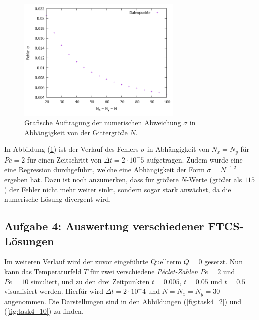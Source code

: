 \documentclass[12pt,a4paper,titlepage,headinclude,bibtotoc]{scrartcl}
\begin{document}
\begin{figure}[H]
 \centering
   \includegraphics[width=0.7\textwidth]{res/task3.png}
   \caption{Grafische Auftragung der numerischen Abweichung $\sigma$ in Abhängigkeit von der Gittergröße $N$.}
 \label{fig:task3}
\end{figure}

In Abbildung (\ref{fig:task3}) ist der Verlauf des Fehlers $\sigma$ in Abhängigkeit von $N_x = N_y$ für $Pe = 2$ für einen Zeitschritt von $\Delta t = 2 \cdot 10^-5$ aufgetragen.
Zudem wurde eine eine Regression durchgeführt, welche eine Abhängigkeit der Form $\sigma = N^{-1.2}$ ergeben hat. Dazu ist noch anzumerken, dass für größere $N$-Werte (größer als $115$) der Fehler nicht mehr weiter sinkt, sondern sogar stark anwächst, da die numerische Lösung divergent wird.


\subsection{Aufgabe 4: Auswertung verschiedener FTCS-Lösungen}
\label{sec:task4}
Im weiteren Verlauf wird der zuvor eingeführte Quellterm $Q=0$ gesetzt. Nun kann das Temperaturfeld $T$ für zwei verschiedene \textit{Péclet-Zahlen} $Pe = 2$ und $Pe = 10$ simuliert, und zu den drei Zeitpunkten $t = 0.005$, $t = 0.05$ und $t=0.5$ visualisiert werden. Hierfür wird $\Delta t = 2 \cdot 10^-4$ und $N=N_x=N_y = 30$ angenommen. Die Darstellungen sind in den Abbildungen (\ref{fig:task4_2}) und (\ref{fig:task4_10}) zu finden.
\end{document}
